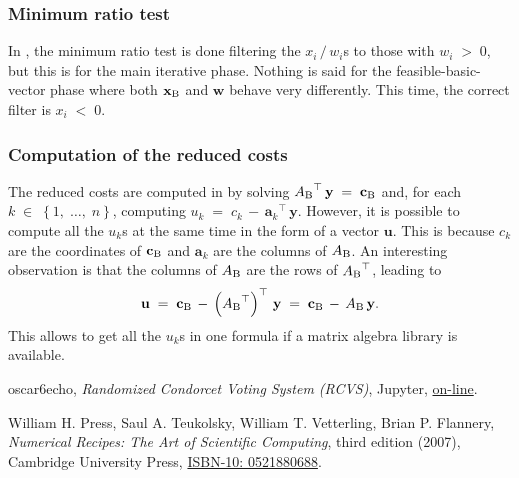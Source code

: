 \documentclass{report}
\theoremstyle{definition}
\theoremstyle{plain}
\begin{document}
\subsubsection{Minimum ratio test}
In \cite{num_rec}, the minimum ratio test is done filtering the $x_i\,/\,w_i$s
to those with $w_i\;>\;0$, but this is for the main iterative phase. Nothing is
said for the feasible-basic-vector phase where both $\mathbf x_{\rm B}$ and
$\mathbf w$ behave very differently. This time, the correct filter is
$x_i\;<\;0$.

\subsubsection{Computation of the reduced costs}
The reduced costs are computed in \cite{num_rec} by solving
${A_{\rm B}}^\top\,\mathbf y\;=\;\mathbf c_{\rm B}$ and, for each
$k\;\in\;\left\{1,\;\ldots,\;n\right\}$, computing
$u_k\;=\;c_k\,-\,{\mathbf a_k}^\top\,\mathbf y$. However, it is possible to
compute all the $u_k$s at the same time in the form of a vector $\mathbf u$.
This is because $c_k$ are the coordinates of $\mathbf c_{\rm B}$ and
$\mathbf a_k$ are the columns of $A_{\rm B}$. An interesting observation is
that the columns of $A_{\rm B}$ are the rows of ${A_{\rm B}}^\top$, leading to
\[
	\mathbf u
		\;=\;\mathbf c_{\rm B}
			\,-\,\left({A_{\rm B}}^\top\right)^\top\,\mathbf y
		\;=\;\mathbf c_{\rm B}\,-\,A_{\rm B}\,\mathbf y.
\]
This allows to get all the $u_k$s in one formula if a matrix algebra library is
available.

\begin{thebibliography}{9}
	oscar6echo,
	\textit{Randomized Condorcet Voting System (RCVS)},
	Jupyter,
	\href{https://nbviewer.jupyter.org/github/oscar6echo/randomized-condorcet-voting-system/blob/master/Randomized-Condorcet-Voting-System.ipynb}{on-line}.

	William H. Press, Saul A. Teukolsky,
	William T. Vetterling, Brian P. Flannery,
	\textit{Numerical Recipes: The Art of Scientific Computing},
	third edition (2007),
	Cambridge University Press,
	\href{http://numerical.recipes/aboutNR3book.html}{ISBN-10: 0521880688}.
\end{thebibliography}
\end{document}
